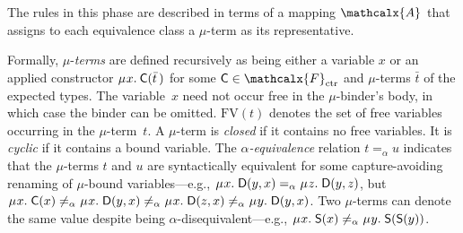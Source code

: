 \documentclass[letter]{article}
\newcommand\MU{\vvthinspace\mu\vvthinspace}
\theoremstyle{definition}
\newcommand\FV{\mathrm{FV}}
\newcommand\const[1]{\textsf{#1}}
\renewcommand{\vec}[1]{\bar #1}
\newcommand{\rn}[1]{\textsf{#1}}
\newcommand{\Val}{\mathcalx{A}\vvthinspace}
\newcommand{\aequiv}{\mathrel{=_\alpha}}
\newcommand\Types{\mathcalx{Y}}
\newcommand\Funcs{\mathcalx{F}}
\newcommand\Codata{\Types_{\mathrm{codt}}}
\newcommand\Nondata{\Types_{\mathrm{ord}}}
\newcommand\Ctr{\Funcs_{\smash{\mathrm{ctr}}}}
\newcommand\vvthinspace{\kern+0.041667em}
\begin{document}
The rules in this phase are described in terms of a mapping $\Val$
that assigns to each equivalence class a $\mu$-term as its representative.

Formally, $\mu$-\emph{terms} are defined recursively as being either a variable $x$
or an applied constructor
$\MU x.\: \const{C}( \vec t\, )$ for some $\const{C} \in \Ctr$ and
$\mu$-terms $\vec t$ of the expected types.
The variable~$x$ need not occur free in the $\mu$-binder's body, in which case
the binder can be omitted.
$\FV( t )$ denotes the set of free variables occurring in the $\mu$-term~$t$.
A $\mu$-term is \emph{closed} if %
it contains no free variables. It is \emph{cyclic} if %
it contains a bound variable. The $\alpha$\emph{-equiv\-alence} relation $t \aequiv u$
indicates that the $\mu$-terms $t$ and $u$
are syntactically equivalent for some capture-avoiding renaming of $\mu$-bound variables---e.g.,
$\MU x.\; \const{D}( y, x ) \aequiv \MU z.\; \const{D}( y, z )$,
but
$\MU x.\; \const{C}( x ) \not\aequiv \MU x.\; \const{D}( y, x ) \not\aequiv \MU x.\; \const{D}( z, x )
\not\aequiv \MU y.\; \const{D}( y, x )$.
Two $\mu$-terms can denote the same value despite being $\alpha$-disequivalent---e.g.,
$\MU x.\; \const{S}( x ) \not\aequiv \MU y.\; \const{S}( \const{S}( y ) )$.


%
%
%
\end{document}

